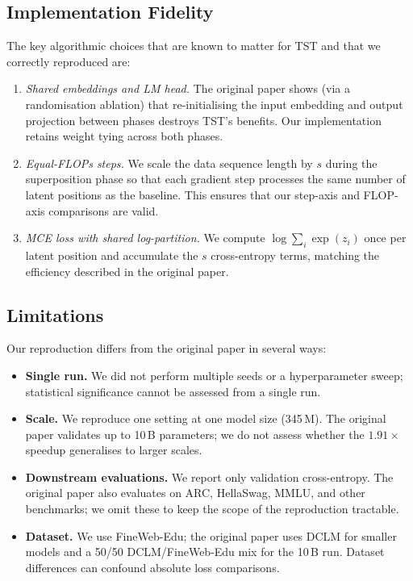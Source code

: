 \documentclass{article}
\begin{document}
\subsection{Implementation Fidelity}

The key algorithmic choices that are known to matter for TST and that we
correctly reproduced are:
\begin{enumerate}
    \item \emph{Shared embeddings and LM head.}
    The original paper shows (via a randomisation ablation) that
    re-initialising the input embedding and output projection between phases
    destroys TST's benefits.
    Our implementation retains weight tying across both phases.
    \item \emph{Equal-FLOPs steps.}
    We scale the data sequence length by $s$ during the superposition phase so
    that each gradient step processes the same number of latent positions as the
    baseline.
    This ensures that our step-axis and FLOP-axis comparisons are valid.
    \item \emph{MCE loss with shared log-partition.}
    We compute $\log\sum_i \exp(z_i)$ once per latent position and accumulate the
    $s$ cross-entropy terms, matching the efficiency described in the original paper.
\end{enumerate}

\subsection{Limitations}

Our reproduction differs from the original paper in several ways:
\begin{itemize}
    \item \textbf{Single run.} We did not perform multiple seeds or a hyperparameter
    sweep; statistical significance cannot be assessed from a single run.
    \item \textbf{Scale.} We reproduce one setting at one model size (345\,M).
    The original paper validates up to 10\,B parameters; we do not assess
    whether the $1.91\times$ speedup generalises to larger scales.
    \item \textbf{Downstream evaluations.} We report only validation cross-entropy.
    The original paper also evaluates on ARC, HellaSwag, MMLU, and other benchmarks;
    we omit these to keep the scope of the reproduction tractable.
    \item \textbf{Dataset.} We use FineWeb-Edu; the original paper uses DCLM for
    smaller models and a 50/50 DCLM/FineWeb-Edu mix for the 10\,B run.
    Dataset differences can confound absolute loss comparisons.
\end{itemize}
\end{document}
